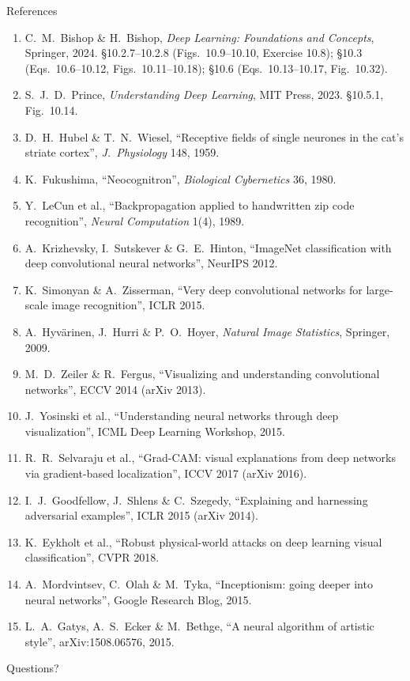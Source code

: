 \documentclass[aspectratio=169, 11pt]{beamer}
\begin{document}
\begin{frame}[allowframebreaks]{References}
  \vspace{0.3em}
  {\scriptsize
  \begin{enumerate}\itemsep0.30em
    \item C.\ M.\ Bishop \& H.\ Bishop, \emph{Deep Learning: Foundations
          and Concepts}, Springer, 2024. \S10.2.7--10.2.8
          (Figs.~10.9--10.10, Exercise 10.8); \S10.3 (Eqs.~10.6--10.12,
          Figs.~10.11--10.18); \S10.6 (Eqs.~10.13--10.17, Fig.~10.32).
    \item S.\ J.\ D.\ Prince, \emph{Understanding Deep Learning}, MIT
          Press, 2023. \S10.5.1, Fig.~10.14.
    \item D.\ H.\ Hubel \& T.\ N.\ Wiesel, ``Receptive fields of single
          neurones in the cat's striate cortex'', \emph{J.\ Physiology}
          148, 1959.
    \item K.\ Fukushima, ``Neocognitron'', \emph{Biological
          Cybernetics} 36, 1980.
    \item Y.\ LeCun et al., ``Backpropagation applied to handwritten
          zip code recognition'', \emph{Neural Computation} 1(4), 1989.
    \item A.\ Krizhevsky, I.\ Sutskever \& G.\ E.\ Hinton, ``ImageNet
          classification with deep convolutional neural networks'',
          NeurIPS 2012.
    \item K.\ Simonyan \& A.\ Zisserman, ``Very deep convolutional
          networks for large-scale image recognition'', ICLR 2015.
    \item A.\ Hyv\"arinen, J.\ Hurri \& P.\ O.\ Hoyer, \emph{Natural
          Image Statistics}, Springer, 2009.
    \item M.\ D.\ Zeiler \& R.\ Fergus, ``Visualizing and understanding
          convolutional networks'', ECCV 2014 (arXiv 2013).
    \item J.\ Yosinski et al., ``Understanding neural networks through
          deep visualization'', ICML Deep Learning Workshop, 2015.
    \item R.\ R.\ Selvaraju et al., ``Grad-CAM: visual explanations from
          deep networks via gradient-based localization'', ICCV 2017
          (arXiv 2016).
    \item I.\ J.\ Goodfellow, J.\ Shlens \& C.\ Szegedy, ``Explaining and
          harnessing adversarial examples'', ICLR 2015 (arXiv 2014).
    \item K.\ Eykholt et al., ``Robust physical-world attacks on deep
          learning visual classification'', CVPR 2018.
    \item A.\ Mordvintsev, C.\ Olah \& M.\ Tyka, ``Inceptionism: going
          deeper into neural networks'', Google Research Blog, 2015.
    \item L.\ A.\ Gatys, A.\ S.\ Ecker \& M.\ Bethge, ``A neural
          algorithm of artistic style'', arXiv:1508.06576, 2015.
  \end{enumerate}}
\end{frame}

\begin{frame}[standout]
  Questions?
\end{frame}
\end{document}
